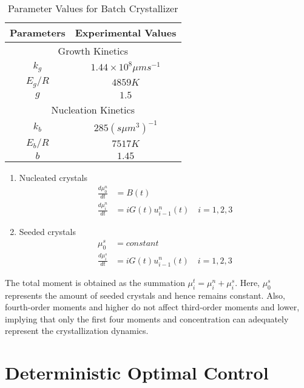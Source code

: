 \documentclass[3p,times]{elsarticle}
\begin{document}
\begin{center}
\begin{table}[!h]
\centering
\caption{Parameter Values for Batch Crystallizer\cite{hu,paeng}}
\begin{tabular}{|c|c|}
\hline
Parameters & Experimental Values \\
\hline
\multicolumn{2}{|c|}{Growth Kinetics} \\
\hline
$k_{g}$ & $1.44\times10^{8} \mu m s^{-1}$ \\
$E_{g}/R$ & $4859K$ \\
$g$ & $1.5$ \\
\hline
\multicolumn{2}{|c|}{Nucleation Kinetics} \\
\hline
$k_{b}$ & $285 (s \mu m^{3})^{-1}$ \\ 
$E_{b}/R$ & $7517K$ \\
$b$ & $1.45$ \\
\hline
\end{tabular}
\label{Table1}
\end{table}
\end{center}
\begin{enumerate}

\item Nucleated crystals\cite{hu,paeng} 
\begin{align}
\frac{d\mu_{0}^{n}}{dt} &= B(t) \\
\frac{d\mu_{i}^{n}}{dt} &= iG(t)u_{i-1}^{n}(t) \quad  i = 1,2,3
\end{align}

\item Seeded crystals\cite{hu,paeng}
\begin{align}
\mu_{0}^{s} &= constant \\ \label{seed}
\frac{d\mu_{i}^{s}}{dt} &= iG(t)u_{i-1}^{n}(t) \quad  i = 1,2,3 
\end{align}
\end{enumerate}
The total moment is obtained as the summation $\mu_{i}^{t} = \mu_{i}^{n} + \mu_{i}^{s}$. Here, $\mu_{0}^{s}$ represents the amount of seeded crystals and hence remains constant. Also, fourth-order moments and higher do not affect third-order moments and lower, implying that only the first four moments and concentration can adequately represent the crystallization dynamics\cite{shi}. 


\section{Deterministic Optimal Control}\label{secdet}
\end{document}
